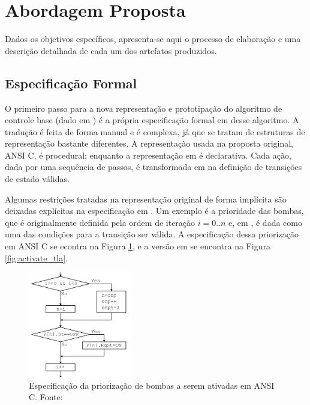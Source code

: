 \documentclass[12pt]{article}
\begin{document}
\section{Abordagem Proposta}

Dados os objetivos específicos, apresenta-se aqui o processo de elaboração e uma
descrição detalhada de cada um dos artefatos produzidos.

\subsection{Especificação Formal}

O primeiro passo para a nova representação e prototipação do algoritmo de
controle base (dado em \cite{pumps}) é a própria especificação formal em \TLA
desse algoritmo. A tradução é feita de forma manual e é complexa, já que se
tratam de estruturas de representação bastante diferentes. A representação usada
na proposta original, ANSI C, é procedural; enquanto a representação em \TLA é
declarativa. Cada ação, dada por uma sequência de passos, é transformada em na
definição de transições de estado válidas.

Algumas restrições tratadas na representação original de forma implícita são
deixadas explícitas na especificação em \TLA. Um exemplo é a prioridade das
bombas, que é originalmente definida pela ordem de iteração $i=0..n$ e, em \TLA,
é dada como uma das condições para a transição ser válida. A especificação dessa
priorização em ANSI C se econtra na Figura \ref{fig:activate_ansi}, e a versão
em \TLA se encontra na Figura \ref{fig:activate_tla}.

\begin{figure}[h]
\begin{center}
  \includegraphics[width=0.4\textwidth]{activate_ansi.png}
\end{center}
  \caption{Especificação da priorização de bombas a serem ativadas em ANSI C.
    Fonte: \cite{pumps}}
  \label{fig:activate_ansi}
\end{figure}
\end{document}
